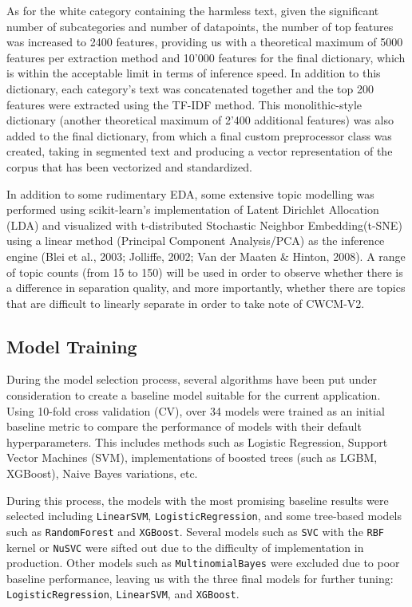 \documentclass[
  titlepage]{article}
\begin{document}
As for the white category containing the harmless text, given the
significant number of subcategories and number of datapoints, the number
of top features was increased to 2400 features, providing us with a
theoretical maximum of 5000 features per extraction method and 10'000
features for the final dictionary, which is within the acceptable limit
in terms of inference speed. In addition to this dictionary, each
category's text was concatenated together and the top 200 features were
extracted using the TF-IDF method. This monolithic-style dictionary
(another theoretical maximum of 2'400 additional features) was also
added to the final dictionary, from which a final custom preprocessor
class was created, taking in segmented text and producing a vector
representation of the corpus that has been vectorized and standardized.

In addition to some rudimentary EDA, some extensive topic modelling was
performed using scikit-learn's implementation of Latent Dirichlet
Allocation (LDA) and visualized with t-distributed Stochastic Neighbor
Embedding(t-SNE) using a linear method (Principal Component
Analysis/PCA) as the inference engine (Blei et al., 2003; Jolliffe,
2002; Van der Maaten \& Hinton, 2008). A range of topic counts (from 15
to 150) will be used in order to observe whether there is a difference
in separation quality, and more importantly, whether there are topics
that are difficult to linearly separate in order to take note of
CWCM-V2.

\subsection{Model Training}\label{model-training}

During the model selection process, several algorithms have been put
under consideration to create a baseline model suitable for the current
application. Using 10-fold cross validation (CV), over 34 models were
trained as an initial baseline metric to compare the performance of
models with their default hyperparameters. This includes methods such as
Logistic Regression, Support Vector Machines (SVM), implementations of
boosted trees (such as LGBM, XGBoost), Naive Bayes variations, etc.

During this process, the models with the most promising baseline results
were selected including \texttt{LinearSVM}, \texttt{LogisticRegression},
and some tree-based models such as \texttt{RandomForest} and
\texttt{XGBoost}. Several models such as \texttt{SVC} with the
\texttt{RBF} kernel or \texttt{NuSVC} were sifted out due to the
difficulty of implementation in production. Other models such as
\texttt{MultinomialBayes} were excluded due to poor baseline
performance, leaving us with the three final models for further tuning:
\texttt{LogisticRegression}, \texttt{LinearSVM}, and \texttt{XGBoost}.
\end{document}
